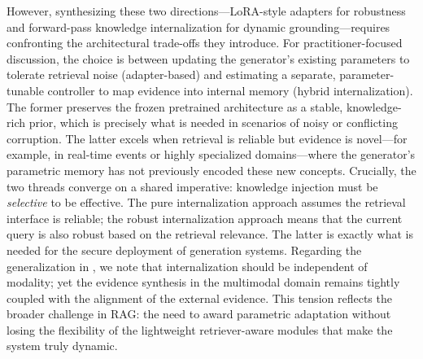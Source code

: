 \documentclass[11pt,a4paper]{article}
\begin{document}
However, synthesizing these two directions---LoRA-style adapters for robustness and forward-pass knowledge internalization for dynamic grounding---requires confronting the architectural trade-offs they introduce. For practitioner-focused discussion, the choice is between updating the generator's existing parameters to tolerate retrieval noise (adapter-based) and estimating a separate, parameter-tunable controller to map evidence into internal memory (hybrid internalization). The former preserves the frozen pretrained architecture as a stable, knowledge-rich prior, which is precisely what is needed in scenarios of noisy or conflicting corruption. The latter excels when retrieval is reliable but evidence is novel---for example, in real-time events or highly specialized domains---where the generator's parametric memory has not previously encoded these new concepts. Crucially, the two threads converge on a shared imperative: knowledge injection must be \emph{selective} to be effective. The pure internalization approach assumes the retrieval interface is reliable; the robust internalization approach means that the current query is also robust based on the retrieval relevance. The latter is exactly what is needed for the secure deployment of generation systems. Regarding the generalization in \cite{arxiv:2503.18016v1}, we note that internalization should be independent of modality; yet the evidence synthesis in the multimodal domain remains tightly coupled with the alignment of the external evidence. This tension reflects the broader challenge in RAG: the need to award parametric adaptation without losing the flexibility of the lightweight retriever-aware modules that make the system truly dynamic.
\end{document}
